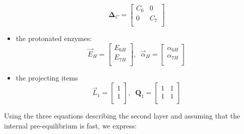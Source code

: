 \documentclass[aps,onecolumn,11pt]{revtex4}
\newcommand{\mymat}[1]{{\bm{#1}}}
\begin{document}
\begin{itemize}
\begin{equation}
	\mymat{\Delta}_C = 
	\begin{bmatrix}
	C_6 & 0\\
	 0& C_7\\
	\end{bmatrix}
\end{equation}
\item the protonated enzymes:
\begin{equation}
	\vec{E}_H = 
	\begin{bmatrix}
	E_{6H}\\
	E_{7H}\\
	\end{bmatrix},\;\;
\vec{\alpha}_H = 
	\begin{bmatrix}
	\alpha_{6H}\\
	\alpha_{7H}\\
	\end{bmatrix} 
\end{equation}
\item the projecting items
\begin{equation}
	\vec{L}_1 = 
	\begin{bmatrix}
	1\\
	1\\
	\end{bmatrix},\;\;
	\mymat{Q}_1 = 
	\begin{bmatrix}
	1&1\\
	1&1\\
	\end{bmatrix}
\end{equation}

\end{itemize}

Using the three equations describing the second layer and assuming that the internal pre-equilibrium is fast, we express:
\end{document}
